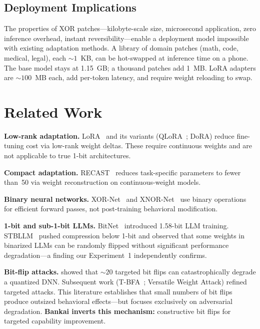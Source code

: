 \documentclass[11pt,a4paper]{article}
\begin{document}
\subsection{Deployment Implications}

The properties of XOR patches---kilobyte-scale size, microsecond
application, zero inference overhead, instant reversibility---enable
a deployment model impossible with existing adaptation methods.
A library of domain patches (math, code, medical, legal), each
${\sim}1$~KB, can be hot-swapped at inference time on a phone.
The base model stays at 1.15~GB; a thousand patches add 1~MB.
LoRA adapters are ${\sim}100$~MB each, add per-token latency,
and require weight reloading to swap.

\section{Related Work}

\textbf{Low-rank adaptation.}
LoRA~\citep{hu2021lora} and its variants (QLoRA~\citep{dettmers2023qlora};
DoRA) reduce fine-tuning cost via low-rank weight deltas. These require
continuous weights and are not applicable to true 1-bit architectures.

\textbf{Compact adaptation.}
RECAST~\citep{xu2024recast} reduces task-specific parameters to fewer
than~50 via weight reconstruction on continuous-weight models.

\textbf{Binary neural networks.}
XOR-Net~\citep{bulat2020xornet} and XNOR-Net~\citep{rastegari2016xnor}
use binary operations for efficient forward passes, not post-training
behavioral modification.

\textbf{1-bit and sub-1-bit LLMs.}
BitNet~\citep{wang2023bitnet} introduced 1.58-bit LLM training.
STBLLM~\citep{dong2024stbllm} pushed compression below 1-bit and
observed that some weights in binarized LLMs can be randomly flipped
without significant performance degradation---a finding our
Experiment~1 independently confirms.

\textbf{Bit-flip attacks.}
\citet{rakin2019bitflip} showed that ${\sim}20$ targeted bit flips can
catastrophically degrade a quantized DNN. Subsequent work
(T-BFA~\citep{bai2021tbfa}; Versatile Weight Attack) refined targeted
attacks. This literature establishes that small numbers of bit flips
produce outsized behavioral effects---but focuses exclusively on
adversarial degradation. \textbf{Bankai inverts this mechanism:}
constructive bit flips for targeted capability improvement.
\end{document}
